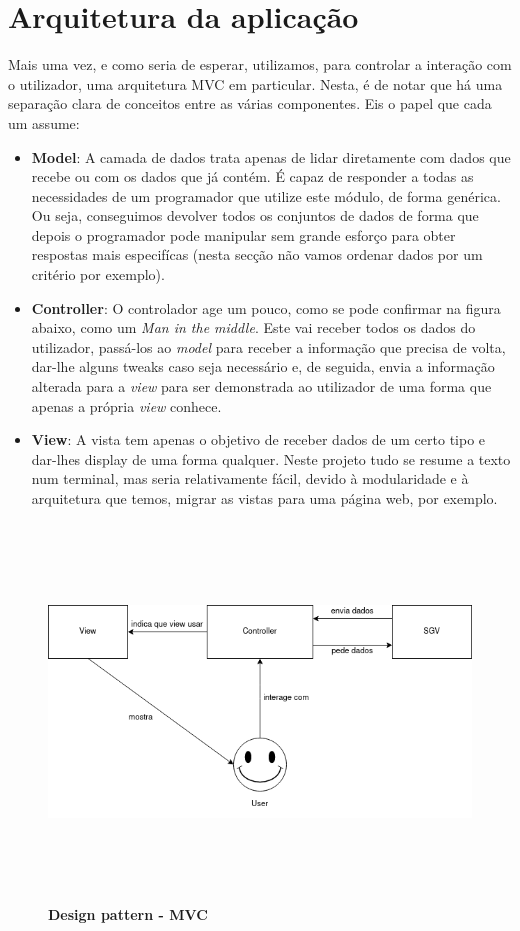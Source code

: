 \documentclass[11pt]{article}
\begin{document}
\section{Arquitetura da aplicação}
Mais uma vez, e como seria de esperar, utilizamos, para controlar a interação com o utilizador, uma arquitetura MVC em particular. Nesta, é de notar que há uma separação clara de conceitos entre as várias componentes. Eis o papel que cada um assume:
\begin{itemize}
    \item \textbf{Model}: A camada de dados trata apenas de lidar diretamente com dados que recebe ou com os dados que já contém. É capaz de responder a todas as necessidades de um programador que utilize este módulo, de forma genérica. Ou seja, conseguimos devolver todos os conjuntos de dados de forma que depois o programador pode manipular sem grande esforço para obter respostas mais especifícas (nesta secção não vamos ordenar dados por um critério por exemplo).
    \item \textbf{Controller}: O controlador age um pouco, como se pode confirmar na figura abaixo, como um \textit{Man in the middle}. Este vai receber todos os dados do utilizador, passá-los ao \textit{model} para receber a informação que precisa de volta, dar-lhe alguns tweaks caso seja necessário e, de seguida, envia a informação alterada para a \textit{view} para ser demonstrada ao utilizador de uma forma que apenas a própria \textit{view} conhece.
    \item \textbf{View}: A vista tem apenas o objetivo de receber dados de um certo tipo e dar-lhes display de uma forma qualquer. Neste projeto tudo se resume a texto num terminal, mas seria relativamente fácil, devido à modularidade e à arquitetura que temos, migrar as vistas para uma página web, por exemplo.
\end{itemize}

\vspace{1cm}
\begin{figure}[h]
    \centering
    \includegraphics[width=\textwidth,height=10cm]{images/mvc.png}
    \caption{\textbf{Design pattern - MVC}}
\end{figure}
\end{document}
